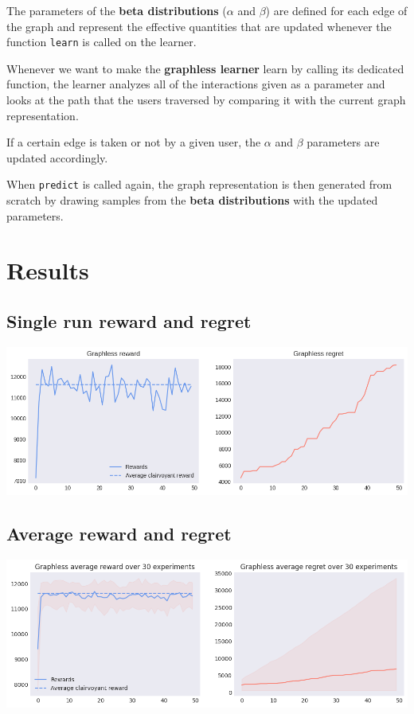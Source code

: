 The parameters of the \textbf{beta distributions} ($\alpha$ and $\beta$) are defined for each edge of the graph and represent the effective quantities that are updated whenever the function \texttt{learn} is called on the learner.

Whenever we want to make the \textbf{graphless learner} learn by calling its dedicated function, the learner analyzes all of the interactions given as a parameter and looks at the path that the users traversed by comparing it with the current graph representation.

If a certain edge is taken or not by a given user, the $\alpha$ and $\beta$ parameters are updated accordingly.

When \texttt{predict} is called again, the graph representation is then generated from scratch by drawing samples from the \textbf{beta distributions} with the updated parameters.

\section{Results}


\subsection{Single run reward and regret}

\begin{center}
	\includegraphics[scale=0.4]{img/Graphs/graphless/image1.png}
\end{center}

\subsection{Average reward and regret}

\begin{center}
	\includegraphics[scale=0.4]{img/Graphs/graphless/image2.png}
\end{center}

